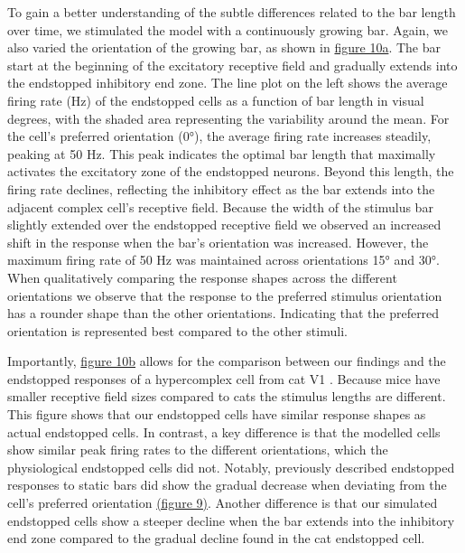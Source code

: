 \documentclass[12pt]{article}
\begin{document}
To gain a better understanding of the subtle differences related to the bar length over time, we stimulated the model with a continuously growing bar. Again, we also varied the orientation of the growing bar, as shown in \hyperref[fig:endstopping_length]{figure 10a}. The bar start at the beginning of the excitatory receptive field and gradually extends into the endstopped inhibitory end zone. The line plot on the left shows the average firing rate (Hz) of the endstopped cells as a function of bar length in visual degrees, with the shaded area representing the variability around the mean. For the cell's preferred orientation (0°), the average firing rate increases steadily, peaking at 50 Hz. This peak indicates the optimal bar length that maximally activates the excitatory zone of the endstopped neurons. Beyond this length, the firing rate declines, reflecting the inhibitory effect as the bar extends into the adjacent complex cell's receptive field. Because the width of the stimulus bar slightly extended over the endstopped receptive field we observed an increased shift in the response when the bar's orientation was increased. However, the maximum firing rate of 50 Hz was maintained across orientations 15° and 30°. When qualitatively comparing the response shapes across the different orientations we observe that the response to the preferred stimulus orientation has a rounder shape than the other orientations. Indicating that the preferred orientation is represented best compared to the other stimuli.  

Importantly, \hyperref[fig:endstopping_length]{figure 10b} allows for the comparison between our findings and the endstopped responses of a hypercomplex cell from cat V1 \autocite{orbanDimensionsPropertiesEndzone1979}. Because mice have smaller receptive field sizes compared to cats the stimulus lengths are different. This figure shows that our endstopped cells have similar response shapes as actual endstopped cells. In contrast, a key difference is that the modelled cells show similar peak firing rates to the different orientations, which the physiological endstopped cells did not. Notably, previously described endstopped responses to static bars did show the gradual decrease when deviating from the cell's preferred orientation \hyperref[fig:endstopping]{(figure 9)}. Another difference is that our simulated endstopped cells show a steeper decline when the bar extends into the inhibitory end zone compared to the gradual decline found in the cat endstopped cell. 
\end{document}
